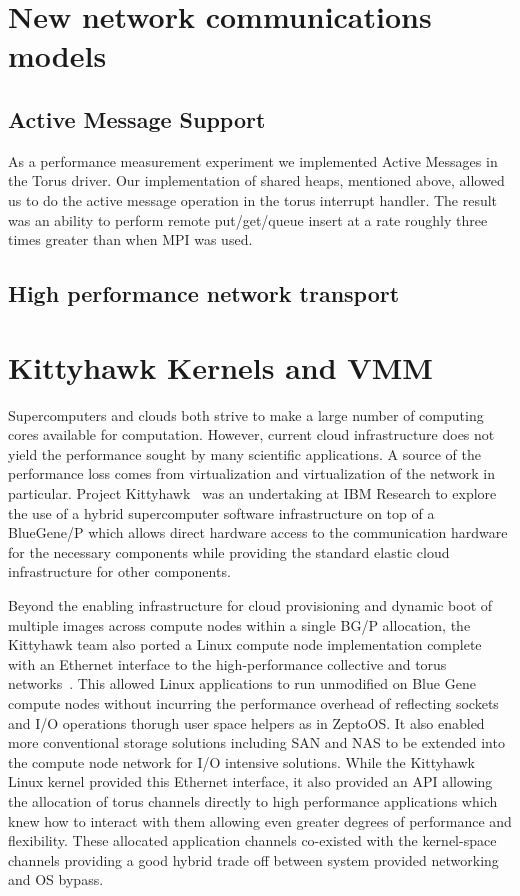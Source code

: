 \section{New network communications models}
\subsection{Active Message Support}
As a performance measurement experiment we implemented 
Active Messages in the Torus driver. Our implementation 
of shared heaps, mentioned above, allowed us to do the active message
operation in the torus interrupt handler. The result was an 
ability to perform remote put/get/queue insert at a rate roughly 
three times greater than when MPI was used. 

\subsection{High performance network transport}


\section{Kittyhawk Kernels and VMM}

Supercomputers and clouds both strive to make a large number of 
computing cores available for computation. 
However, current cloud infrastructure does not yield the performance 
sought by many scientific applications. A source of the performance 
loss comes from virtualization and virtualization of the network in 
particular. 
Project Kittyhawk~\cite{kh-sciencecloud} was an undertaking at IBM Research 
to explore the use of a hybrid supercomputer software infrastructure
on top of a BlueGene/P which allows direct hardware access to the 
communication hardware for the necessary components while providing 
the standard elastic cloud infrastructure for other components.

Beyond the enabling infrastructure for cloud provisioning and dynamic
boot of multiple images across compute nodes within a single BG/P
allocation, the Kittyhawk team also ported a Linux compute node
implementation complete with an Ethernet interface to the high-performance
collective and torus networks~\cite{kh-systemsjournal}.  
This allowed Linux applications to run unmodified on Blue Gene compute 
nodes without incurring the performance 
overhead of reflecting sockets and I/O operations thorugh user space
helpers as in ZeptoOS.  It also enabled more conventional storage solutions
including SAN and NAS to be extended into the compute node network for
I/O intensive solutions.  While the Kittyhawk Linux kernel provided this
Ethernet interface, it also provided an API allowing the allocation of
torus channels directly to high performance applications which knew how to
interact with them allowing even greater degrees of performance and flexibility.
These allocated application channels co-existed with the kernel-space channels
providing a good hybrid trade off between system provided networking and
OS bypass.

